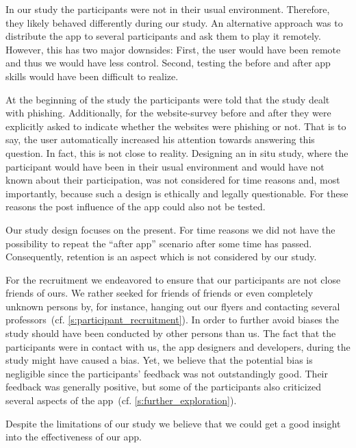 \begin{description}[leftmargin=0cm]
	\item[Behavior Change:] In our study the participants were not in their usual environment. 
	Therefore, they likely behaved differently during our study.
	An alternative approach was to distribute the app to several participants and ask them to play it remotely.
	However, this has two major downsides: First, the user would have been remote and thus we would have less control.
	Second, testing the before and after app skills would have been difficult to realize.
	\item[Increased Attention:] At the beginning of the study the participants were told that the study dealt with phishing.
	Additionally, for the website-survey before and after they were explicitly asked to indicate whether the websites were phishing or not.
	That is to say, the user automatically increased his attention towards answering this question.
	In fact, this is not close to reality.
	Designing an in situ study, where the participant would have been in their usual environment and would have not known about their participation, was not considered for time reasons and, most importantly, because such a design is ethically and legally questionable. 
	For these reasons the post influence of the app could also not be tested.
	\item[Knowledge Retention:] Our study design focuses on the present.
	For time reasons we did not have the possibility to repeat the ``after app'' scenario after some time has passed.
	Consequently, retention is an aspect which is not considered by our study.
	\item[Bias:] For the recruitment we endeavored to ensure that our participants are not close friends of ours. 
	We rather seeked for friends of friends or even completely unknown persons by, for instance, hanging out our flyers and contacting several professors~(cf. \autoref{s:participant_recruitment}).
	In order to further avoid biases the study should have been conducted by other persons than us.
	The fact that the participants were in contact with us, the app designers and developers, during the study might have caused a bias.
	Yet, we believe that the potential bias is negligible since the participants' feedback was not outstandingly good.
	Their feedback was generally positive, but some of the participants also criticized several aspects of the app~(cf. \autoref{s:further_exploration}).
\end{description}
Despite the limitations of our study we believe that we could get a good insight into the effectiveness of our app.

